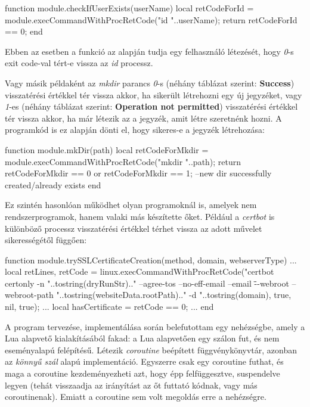 \begin{lua}
function module.checkIfUserExists(userName)
  local retCodeForId = module.execCommandWithProcRetCode("id "..userName);
  return retCodeForId == 0;
end
\end{lua}

Ebben az esetben a \texttt{} funkció az alapján tudja egy felhasználó létezését, hogy \textit{0}-s exit code-val tért-e vissza az \textit{id} processz.

Vagy másik példaként az \textit{mkdir} parancs \textit{0}-s (néhány táblázat szerint: \textbf{Success}) visszatérési értékkel tér vissza akkor, ha sikerült létrehozni egy új jegyzéket, vagy \textit{1}-es (néhány táblázat szerint: \textbf{Operation not permitted}) visszatérési értékkel tér vissza akkor, ha már létezik az a jegyzék, amit létre szeretnénk hozni. A programkód is ez alapján dönti el, hogy sikeres-e a jegyzék létrehozása:
\begin{lua}
function module.mkDir(path)
  local retCodeForMkdir = module.execCommandWithProcRetCode("mkdir "..path);
  return retCodeForMkdir == 0 or retCodeForMkdir == 1; --new dir successfully created/already exists
end
\end{lua}

Ez szintén hasonlóan működhet olyan programoknál is, amelyek nem rendszerprogramok, hanem valaki más készítette őket. Például a \textit{certbot} is különböző processz visszatérési értékkel térhet vissza az adott művelet sikerességétől függően:
\begin{lua}
function module.trySSLCertificateCreation(method, domain, webserverType)
  ...
  local retLines, retCode = linux.execCommandWithProcRetCode("certbot certonly -n "..tostring(dryRunStr).." --agree-tos --no-eff-email --email \"\" --webroot --webroot-path "..tostring(websiteData.rootPath).." -d "..tostring(domain), true, nil, true);
  ...
  local hasCertificate = retCode == 0;
  ...
end
\end{lua}

\pagebreak
{}

A program tervezése, implementálása során belefutottam egy nehézségbe, amely a Lua alapvető kialakításából fakad: a Lua alapvetően egy szálon fut, és nem eseményalapú felépítésű. Létezik \textit{coroutine} beépített függvénykönyvtár, azonban az \textit{könnyű szál} alapú implementáció. Egyszerre csak egy coroutine futhat, és maga a coroutine kezdeményezheti azt, hogy épp felfüggesztve, suspendelve legyen (tehát visszaadja az irányítást az őt futtató kódnak, vagy más coroutinenak). Emiatt a coroutine sem volt megoldás erre a nehézségre.

